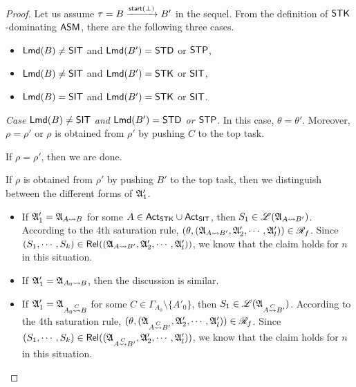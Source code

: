 \begin{proof}
Let us assume $\tau = B \xrightarrow{{\mathsf{start} }(\bot)} B'$ in the sequel. From the definition of ${\sf STK}$-dominating $\textsf{ASM}$, there are the following three cases. 
\begin{itemize}
\item ${\sf Lmd}(B) \neq {\sf SIT}$ and ${\sf Lmd}(B') = {\sf STD}$ or ${\sf STP}$, 
%
\item ${\sf Lmd}(B) \neq {\sf SIT}$ and ${\sf Lmd}(B') = {\sf STK}$ or ${\sf SIT}$, 
%
\item ${\sf Lmd}(B) = {\sf SIT}$ and ${\sf Lmd}(B') = {\sf STK}$ or ${\sf SIT}$. 
\end{itemize}

\smallskip

\noindent \emph{Case ${\sf Lmd}(B) \neq {\sf SIT}$ and ${\sf Lmd}(B') = {\sf STD}$ or ${\sf STP}$}. In this case, $\theta = \theta'$. Moreover, $\rho = \rho'$ or $\rho$ is obtained from $\rho'$ by pushing $C$ to the top task.

If $\rho = \rho'$, then we are done. 

If $\rho$ is obtained from $\rho'$ by pushing $B'$ to the top task, then we distinguish between the different forms of ${\mathfrak{A} }'_1$. 
\begin{itemize}
\item If ${\mathfrak{A} }'_1 = {\mathfrak{A} }_{A \rightsquigarrow B}$ for some $A \in {\sf Act}_{\sf STK} \cup {\sf Act}_{\sf SIT}$, then 
 $S_1 \in  {\mathscr{L} }({\mathfrak{A} }_{A \rightsquigarrow B'})$. According to the 4th saturation rule, $(\theta, ({\mathfrak{A} }_{A \rightsquigarrow B'}, {\mathfrak{A} }'_2, \cdots, {\mathfrak{A} }'_l)) \in \mathscr{R}_f$. Since $(S_1, \cdots, S_k) \in \mathsf{Rel}(({\mathfrak{A} }_{A \rightsquigarrow B'}, {\mathfrak{A} }'_2, \cdots, {\mathfrak{A} }'_l))$, we know that the claim holds for $n$ in this situation.

%
\item If ${\mathfrak{A} }'_1 = {\mathfrak{A} }_{A_0 \rightsquigarrow B}$, then the discussion is similar. 
%
\item If ${\mathfrak{A} }'_1 = {\mathfrak{A} }_{A_0 \stackrel{C}{\rightsquigarrow} B}$ for some $C \in \Gamma_{A_0} \setminus \{A'_0\}$, then $S_1 \in  {\mathscr{L} }({\mathfrak{A} }_{A \stackrel{C}{\rightsquigarrow} B'})$.  According to the 4th saturation rule, $(\theta, ({\mathfrak{A} }_{A \stackrel{C}{\rightsquigarrow} B'}, {\mathfrak{A} }'_2, \cdots, {\mathfrak{A} }'_l)) \in \mathscr{R}_f$. Since $(S_1, \cdots, S_k) \in \mathsf{Rel}(({\mathfrak{A} }_{A \stackrel{C}{\rightsquigarrow} B'}, {\mathfrak{A} }'_2, \cdots, {\mathfrak{A} }'_l))$, we know that the claim holds for $n$ in this situation.
\end{itemize}

\smallskip


\end{proof}

